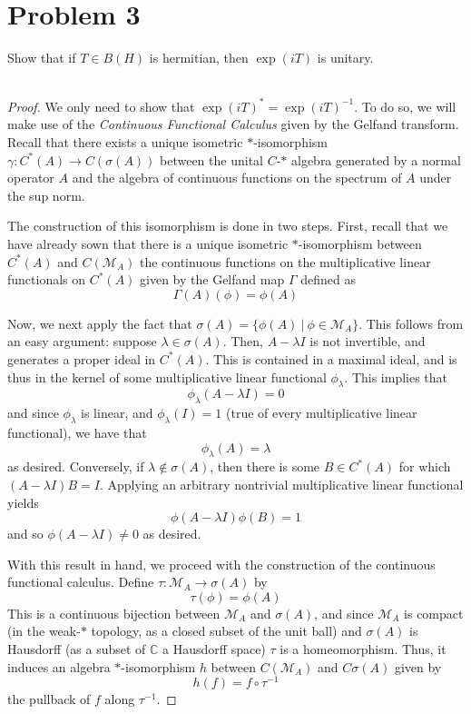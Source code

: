 \documentclass[fontsize=11pt]{scrartcl} %
\numberwithin{equation}{section} %
\numberwithin{figure}{section} %
\numberwithin{table}{section} %
\newcommand{\C}{\mathbb{C}}
\begin{document}
\section*{Problem 3}
Show that if $T\in B(H)$ is hermitian, then $\exp(iT)$ is unitary.
\\
\\
\begin{proof}
    We only need to show that $\exp(iT)^* = \exp(iT)^{-1}$. To do so, we will
    make use of the {\em Continuous Functional Calculus} given by the Gelfand
    transform. Recall that there exists a unique isometric $*$-isomorphism $\gamma:
    C^*(A)\to C(\sigma(A))$ between the unital $C$-$*$ algebra generated by a
    normal operator $A$ and the algebra of continuous functions on the spectrum
    of $A$ under the sup norm.

    The construction of this isomorphism is done in two steps. First, recall
    that we have already sown that there is a unique isometric $*$-isomorphism
    between $C^*(A)$ and $C(\mathscr{M}_A)$ the continuous functions on the
    multiplicative linear functionals on $C^*(A)$ given by the Gelfand map $\Gamma$
    defined as
    \[
        \Gamma(A)(\phi) = \phi(A)
    \]
    
    Now, we next apply the fact that $\sigma(A) = \{\phi(A)\ |\ \phi\in
    \mathscr{M}_A\}$. This follows from an easy argument: suppose
    $\lambda\in\sigma(A)$. Then, $A-\lambda I$ is not invertible, and generates
    a proper ideal in $C^*(A)$. This is contained in a maximal ideal, and is
    thus in the kernel of some multiplicative linear functional
    $\phi_{\lambda}$. This implies that
    \[
        \phi_{\lambda}(A-\lambda I) = 0
    \]
    and since $\phi_{\lambda}$ is linear, and $\phi_{\lambda}(I)=1$ (true of
    every multiplicative linear functional), we have that
    \[
        \phi_{\lambda}(A) = \lambda
    \]
    as desired. Conversely, if $\lambda\not\in\sigma(A)$, then there is some
    $B\in C^*(A)$ for which $(A-\lambda I)B =I$. Applying an arbitrary
    nontrivial multiplicative linear functional yields
    \[
        \phi(A-\lambda I)\phi(B) = 1
    \]
    and so $\phi(A-\lambda I)\neq 0$ as desired.

    With this result in hand, we proceed with the construction of the continuous
    functional calculus. Define $\tau:\mathscr{M}_A\to \sigma(A)$ by
    \[
        \tau(\phi) = \phi(A)
    \]
    This is a continuous bijection between $\mathscr{M}_A$ and $\sigma(A)$, and
    since $\mathscr{M}_A$ is compact (in the weak-$*$ topology, as a closed
    subset of the unit ball) and $\sigma(A)$ is Hausdorff (as a subset of $\C$ a
    Hausdorff space) $\tau$ is a homeomorphism. Thus, it induces an algebra
    $*$-isomorphism $h$ between $C(\mathscr{M}_A)$ and $C\sigma(A)$ given by
    \[
        h(f) = f\circ\tau^{-1}
    \]
    the pullback of $f$ along $\tau^{-1}$.


\end{proof}
\end{document}
